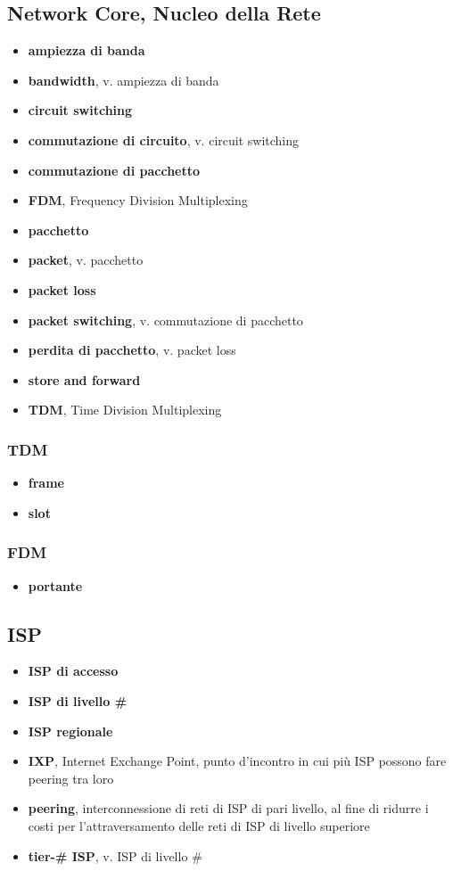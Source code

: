 \documentclass[12pt,a4paper]{article}
\begin{document}
\subsection{Network Core, Nucleo della Rete}
\begin{itemize}
  \item \textbf{ampiezza di banda}
  \item \textbf{bandwidth}, v. ampiezza di banda
  \item \textbf{circuit switching}
  \item \textbf{commutazione di circuito}, v. circuit switching
  \item \textbf{commutazione di pacchetto}
  \item \textbf{FDM}, Frequency Division Multiplexing
  \item \textbf{pacchetto}
  \item \textbf{packet}, v. pacchetto
  \item \textbf{packet loss}
  \item \textbf{packet switching}, v. commutazione di pacchetto
  \item \textbf{perdita di pacchetto}, v. packet loss
  \item \textbf{store and forward}
  \item \textbf{TDM}, Time Division Multiplexing
\end{itemize}

\subsubsection{TDM}
\begin{itemize}
  \item \textbf{frame}
  \item \textbf{slot}
\end{itemize}

\subsubsection{FDM}
\begin{itemize}
  \item \textbf{portante}
\end{itemize}

\subsection{ISP}
\begin{itemize}
  \item \textbf{ISP di accesso}
  \item \textbf{ISP di livello \#}
  \item \textbf{ISP regionale}
  \item \textbf{IXP}, Internet Exchange Point, punto d'incontro in cui
    più ISP possono fare peering tra loro
  \item \textbf{peering}, interconnessione di reti di ISP di pari
    livello, al fine di ridurre i costi per l'attraversamento delle
    reti di ISP di livello superiore
  \item \textbf{tier-\# ISP}, v. ISP di livello \#
\end{itemize}
\end{document}
